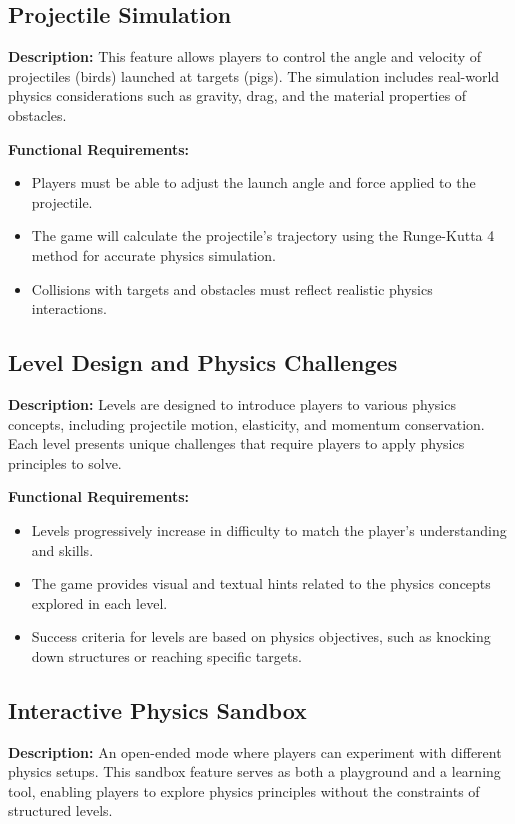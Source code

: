 \documentclass[12pt]{article}
\begin{document}
\subsection{Projectile Simulation}
\textbf{Description:} This feature allows players to control the angle and velocity of projectiles (birds) launched at targets (pigs). The simulation includes real-world physics considerations such as gravity, drag, and the material properties of obstacles.

\textbf{Functional Requirements:}
\begin{itemize}
    \item Players must be able to adjust the launch angle and force applied to the projectile.
    \item The game will calculate the projectile's trajectory using the Runge-Kutta 4 method for accurate physics simulation.
    \item Collisions with targets and obstacles must reflect realistic physics interactions.
\end{itemize}

\subsection{Level Design and Physics Challenges}
\textbf{Description:} Levels are designed to introduce players to various physics concepts, including projectile motion, elasticity, and momentum conservation. Each level presents unique challenges that require players to apply physics principles to solve.

\textbf{Functional Requirements:}
\begin{itemize}
    \item Levels progressively increase in difficulty to match the player's understanding and skills.
    \item The game provides visual and textual hints related to the physics concepts explored in each level.
    \item Success criteria for levels are based on physics objectives, such as knocking down structures or reaching specific targets.
\end{itemize}

\subsection{Interactive Physics Sandbox}
\textbf{Description:} An open-ended mode where players can experiment with different physics setups. This sandbox feature serves as both a playground and a learning tool, enabling players to explore physics principles without the constraints of structured levels.
\end{document}
